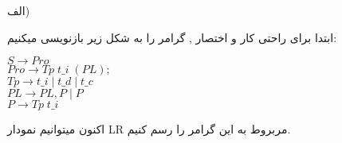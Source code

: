 

الف)

ابتدا برای راحتی کار و اختصار , گرامر را به شکل زیر بازنویسی میکنیم:


\begin{center}
\begin{latin}
$S \rightarrow Pro$
\\
$Pro \rightarrow Tp \; t\_i \; (PL);$
\\
$Tp \rightarrow t\_i \; | \; t\_d \; | \;  t\_c$
\\
$PL \rightarrow PL,P \;  | \; P$
\\
$P \rightarrow Tp \; t\_i$
\end{latin}
\end{center}

اکنون میتوانیم نمودار LR مربروط به این گرامر را رسم کنیم.


